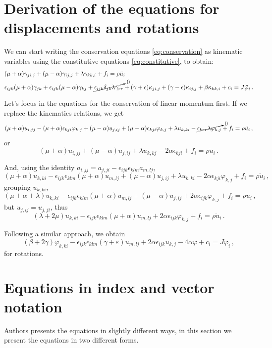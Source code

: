 \documentclass[12pt]{article}
\begin{document}
\section{Derivation of the equations for displacements and rotations}
We can start writing the conservation equations \eqref{eq:conservation} as kinematic variables using the constitutive equations \eqref{eq:constitutive}, to obtain:
\begin{align*}
 & (\mu + \alpha) \gamma_{ji, j} + (\mu - \alpha) \gamma_{ij,j} + \lambda \gamma_{kk, i} + f_i = \rho \ddot{u}_i\\
  & \epsilon_{ijk}(\mu + \alpha) \gamma_{jk} + \epsilon_{ijk}(\mu - \alpha) \gamma_{kj} + \cancelto{0}{\epsilon_{ijk} \delta_{jk} \lambda \gamma_{rr}} + (\gamma + \epsilon) \kappa_{ji,j} + (\gamma - \epsilon) \kappa_{ij,j} + \beta \kappa_{kk, i} + c_i = J \ddot{\varphi}_i\, .
\end{align*}

Let's focus in the equations for the conservation of linear momentum first. If we replace the kinematics relations, we get
\[(\mu + \alpha) u_{i, jj} - (\mu + \alpha)\epsilon_{kji} \varphi_{k, j} + (\mu - \alpha) u_{j, ij} + (\mu - \alpha)\epsilon_{kji} \varphi_{k,j} + \lambda u_{k,ki} - \cancelto{0}{\epsilon_{krr}\lambda \varphi_{k,j}} + f_i = \rho \ddot{u}_i\, , \]
or
\[(\mu + \alpha) u_{i,jj} + (\mu - \alpha) u_{j,ij} + \lambda u_{k,kj} - 2\alpha \epsilon_{kji} + f_i = \rho \ddot{u}_i\, .\]

And, using the identity \(a_{i,jj} = a_{j,ji} - \epsilon_{ijk} \epsilon_{klm} a_{m,lj}\),
\[(\mu + \alpha) u_{k, ki} - \epsilon_{ijk} \epsilon_{klm} (\mu + \alpha) u_{m, lj} + (\mu - \alpha) u_{j,ij} + \lambda u_{k, ki} - 2\alpha \epsilon_{kji} \varphi_{k,j} + f_i = \rho \ddot{u}_i\, ,\]
grouping \(u_{k,ki}\),
\[(\mu + \alpha + \lambda) u_{k, ki} - \epsilon_{ijk} \epsilon_{klm} (\mu + \alpha) u_{m,lj} + (\mu - \alpha) u_{j, ij} + 2\alpha \epsilon_{ijk} \varphi_{k,j} + f_i = \rho \ddot{u}_i\, ,\]
but \(u_{j, ij} = u_{j, ji}\), thus
\[(\lambda + 2\mu) u_{k, ki} - \epsilon_{ijk} \epsilon_{klm} (\mu + \alpha) u_{m,lj}+ 2\alpha \epsilon_{ijk} \varphi_{k,j} + f_i = \rho \ddot{u}_i\, .\]

Following a similar approach, we obtain
\[(\beta + 2\gamma) \varphi_{k, ki} - \epsilon_{ijk} \epsilon_{klm} (\gamma + \varepsilon) u_{m,lj}+ 2\alpha \epsilon_{ijk} u_{k,j} - 4\alpha\varphi + c_i = J \ddot{\varphi}_i\, ,\]
for rotations.

\section{Equations in index and vector notation}
Authors presents the equations in slightly different ways, in this section we present the equations in two different forms.
\end{document}
